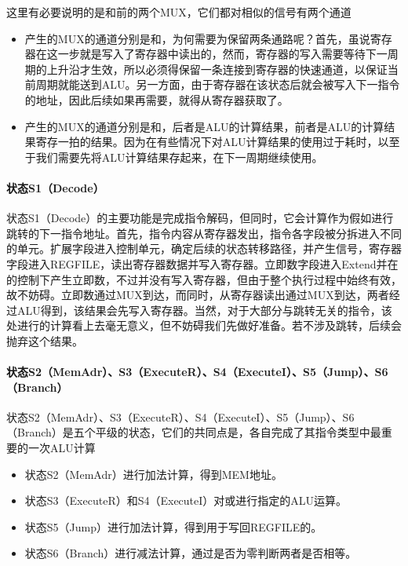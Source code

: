 这里有必要说明的是和前的两个MUX，它们都对相似的信号有两个通道
\begin{itemize}
    \item 产生的MUX的通道分别是和，为何需要为保留两条通路呢？首先，虽说寄存器在这一步就是写入了寄存器中读出的，然而，寄存器的写入需要等待下一周期的上升沿才生效，所以必须得保留一条连接到寄存器的快速通道，以保证当前周期就能送到ALU。另一方面，由于寄存器在该状态后就会被写入下一指令的地址，因此后续如果再需要，就得从寄存器获取了。
    \item 产生的MUX的通道分别是和，后者是ALU的计算结果，前者是ALU的计算结果寄存一拍的结果。因为在有些情况下对ALU计算结果的使用过于耗时，以至于我们需要先将ALU计算结果存起来，在下一周期继续使用。
\end{itemize}

\paragraph{状态S1（Decode）}
状态S1（Decode）的主要功能是完成指令解码，但同时，它会计算作为假如进行跳转的下一指令地址。首先，指令内容从寄存器发出，指令各字段被分拆进入不同的单元。扩展字段进入控制单元，确定后续的状态转移路径，并产生信号，寄存器字段进入REGFILE，读出寄存器数据并写入寄存器。立即数字段进入Extend并在的控制下产生立即数，不过并没有写入寄存器，但由于整个执行过程中始终有效，故不妨碍。立即数通过MUX到达，而同时，从寄存器读出通过MUX到达，两者经过ALU得到，该结果会先写入寄存器。当然，对于大部分与跳转无关的指令，该处进行的计算看上去毫无意义，但不妨碍我们先做好准备。若不涉及跳转，后续会抛弃这个结果。

\paragraph{状态S2（MemAdr）、S3（ExecuteR）、S4（ExecuteI）、S5（Jump）、S6（Branch）}
状态S2（MemAdr）、S3（ExecuteR）、S4（ExecuteI）、S5（Jump）、S6（Branch）是五个平级的状态，它们的共同点是，各自完成了其指令类型中最重要的一次ALU计算

\begin{itemize}
    \item 状态S2（MemAdr）进行加法计算，得到MEM地址。
    \item 状态S3（ExecuteR）和S4（ExecuteI）对或进行指定的ALU运算。
    \item 状态S5（Jump）进行加法计算，得到用于写回REGFILE的。
    \item 状态S6（Branch）进行减法计算，通过是否为零判断两者是否相等。
\end{itemize}


